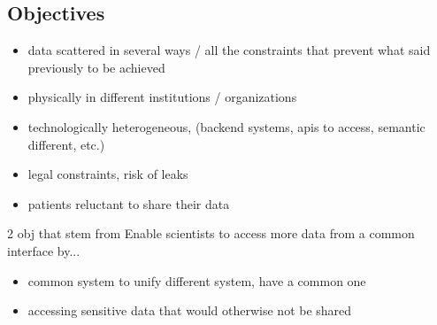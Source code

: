
\subsection*{Objectives}






\begin{itemize}
    \item data scattered in several ways / all the constraints that prevent what said previously to be achieved
    \item physically in different institutions / organizations
    \item technologically heterogeneous, (backend systems, apis to access, semantic different, etc.)
    \item legal constraints, risk of leaks
    \item  patients reluctant to share their data
\end{itemize}

2 obj that stem from Enable scientists to access more data from a common interface by...
\begin{itemize}
    \item common system to unify different system, have a common one
    \item accessing sensitive data that would otherwise not be shared
\end{itemize}


